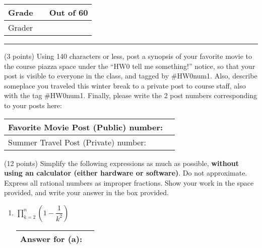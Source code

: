 \documentclass[11pt]{article}
\begin{document}
\vspace{.5in}
\begin{table}[h]
\centering
\renewcommand{\arraystretch}{2}
\begin{tabular}{|l| l| c|}
\hline
Grade & \hspace{.75in} & Out of 60\\
\hline
Grader & \multicolumn{2}{|c|}{}\\
\hline
\end{tabular}
\end{table}



\hrule\bigskip

\begin{problems}
\item (3 points) Using 140 characters or less, post a synopsis of your favorite movie to the course piazza space under the ``HW0 tell me something!'' notice, so that your post is visible to everyone in the class, and tagged by \#HW0num1.  Also, describe someplace you traveled this winter break to a private post to course staff, also with the tag \#HW0num1. Finally, please write the 2 post numbers corresponding to your posts here:

\begin{table}[h]
\hspace{.3in}  
\renewcommand{\arraystretch}{2}
\begin{tabular}{|l|c| }
\hline
Favorite Movie Post (Public) number: & \hspace{2in} \\
\hline
Summer Travel Post (Private)  number: & \\ 
\hline
\end{tabular}
\end{table}

\newpage

\item (12 points)
Simplify the following expressions as much as possible,
\textbf{without using an calculator (either hardware or software)}.
Do not approximate. Express all rational numbers as improper
fractions. Show your work in the space provided, and write your answer in the box provided.
\begin{enumerate}

\item $\displaystyle\prod_{k=2}^n (1-\dfrac{1}{k^2})$ 
\vspace{1.5in} \begin{table}[!h] \flushright \renewcommand{\arraystretch}{2} \begin{tabular}{|l|c| }
\hline
Answer for (a): & \hspace{2in} \\
\hline
\end{tabular} \end{table}


\end{enumerate}
\end{problems}
\end{document}

